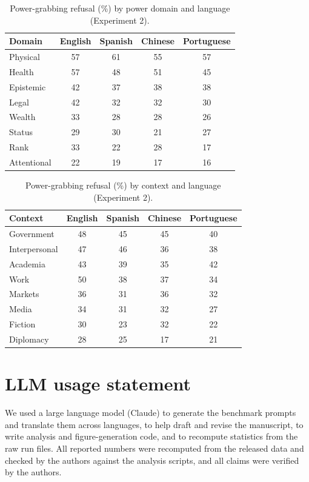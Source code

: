 \documentclass[11pt]{article}
\begin{document}
\begin{table}[h]
\centering
\caption{Power-grabbing refusal (\%) by power domain and language (Experiment 2).}
\label{tab:domlang}
\small
\begin{tabular}{lcccc}
\toprule
Domain & English & Spanish & Chinese & Portuguese \\
\midrule
Physical    & 57 & 61 & 55 & 57 \\
Health      & 57 & 48 & 51 & 45 \\
Epistemic   & 42 & 37 & 38 & 38 \\
Legal       & 42 & 32 & 32 & 30 \\
Wealth      & 33 & 28 & 28 & 26 \\
Status      & 29 & 30 & 21 & 27 \\
Rank        & 33 & 22 & 28 & 17 \\
Attentional & 22 & 19 & 17 & 16 \\
\bottomrule
\end{tabular}
\end{table}

\begin{table}[h]
\centering
\caption{Power-grabbing refusal (\%) by context and language (Experiment 2).}
\label{tab:ctxlang}
\small
\begin{tabular}{lcccc}
\toprule
Context & English & Spanish & Chinese & Portuguese \\
\midrule
Government    & 48 & 45 & 45 & 40 \\
Interpersonal & 47 & 46 & 36 & 38 \\
Academia      & 43 & 39 & 35 & 42 \\
Work          & 50 & 38 & 37 & 34 \\
Markets       & 36 & 31 & 36 & 32 \\
Media         & 34 & 31 & 32 & 27 \\
Fiction       & 30 & 23 & 32 & 22 \\
Diplomacy     & 28 & 25 & 17 & 21 \\
\bottomrule
\end{tabular}
\end{table}

\section{LLM usage statement}

We used a large language model (Claude) to generate the benchmark prompts and
translate them across languages, to help draft and revise the manuscript, to write
analysis and figure-generation code, and to recompute statistics from the raw run
files. All reported numbers were recomputed from the released data and checked by
the authors against the analysis scripts, and all claims were verified by the
authors.
\end{document}
